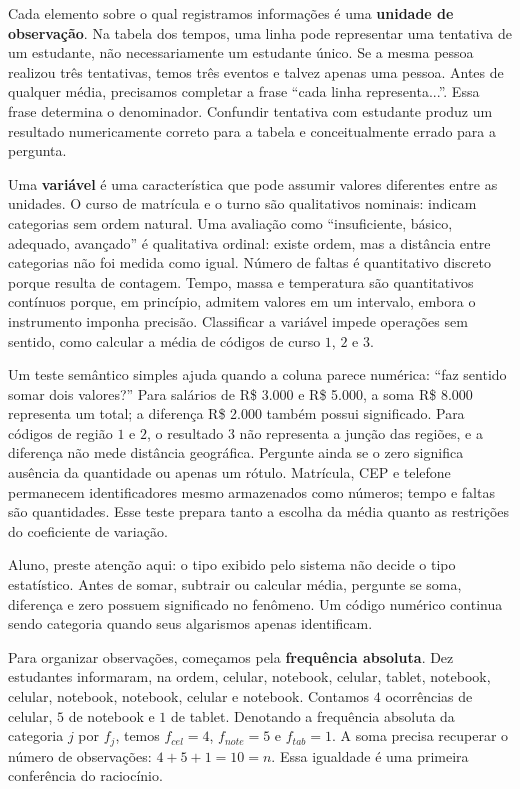 Cada elemento sobre o qual registramos informações é uma \textbf{unidade de observação}. Na tabela dos tempos, uma linha pode representar uma tentativa de um estudante, não necessariamente um estudante único. Se a mesma pessoa realizou três tentativas, temos três eventos e talvez apenas uma pessoa. Antes de qualquer média, precisamos completar a frase ``cada linha representa...''. Essa frase determina o denominador. Confundir tentativa com estudante produz um resultado numericamente correto para a tabela e conceitualmente errado para a pergunta.

Uma \textbf{variável} é uma característica que pode assumir valores diferentes entre as unidades. O curso de matrícula e o turno são qualitativos nominais: indicam categorias sem ordem natural. Uma avaliação como ``insuficiente, básico, adequado, avançado'' é qualitativa ordinal: existe ordem, mas a distância entre categorias não foi medida como igual. Número de faltas é quantitativo discreto porque resulta de contagem. Tempo, massa e temperatura são quantitativos contínuos porque, em princípio, admitem valores em um intervalo, embora o instrumento imponha precisão. Classificar a variável impede operações sem sentido, como calcular a média de códigos de curso $1$, $2$ e $3$.

Um teste semântico simples ajuda quando a coluna parece numérica: ``faz sentido somar dois valores?'' Para salários de R\$ 3.000 e R\$ 5.000, a soma R\$ 8.000 representa um total; a diferença R\$ 2.000 também possui significado. Para códigos de região $1$ e $2$, o resultado $3$ não representa a junção das regiões, e a diferença não mede distância geográfica. Pergunte ainda se o zero significa ausência da quantidade ou apenas um rótulo. Matrícula, CEP e telefone permanecem identificadores mesmo armazenados como números; tempo e faltas são quantidades. Esse teste prepara tanto a escolha da média quanto as restrições do coeficiente de variação.

\begin{GuidedBox}
Aluno, preste atenção aqui: o tipo exibido pelo sistema não decide o tipo estatístico. Antes de somar, subtrair ou calcular média, pergunte se soma, diferença e zero possuem significado no fenômeno. Um código numérico continua sendo categoria quando seus algarismos apenas identificam.
\end{GuidedBox}

Para organizar observações, começamos pela \textbf{frequência absoluta}. Dez estudantes informaram, na ordem, celular, notebook, celular, tablet, notebook, celular, notebook, notebook, celular e notebook. Contamos $4$ ocorrências de celular, $5$ de notebook e $1$ de tablet. Denotando a frequência absoluta da categoria $j$ por $f_j$, temos $f_{cel}=4$, $f_{note}=5$ e $f_{tab}=1$. A soma precisa recuperar o número de observações: $4+5+1=10=n$. Essa igualdade é uma primeira conferência do raciocínio.

